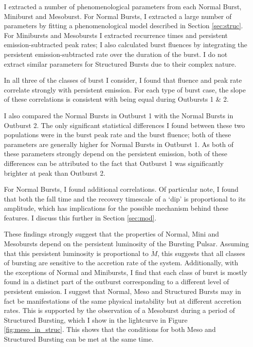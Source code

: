 \par I extracted a number of phenomenological parameters from each Normal Burst, Miniburst and Mesoburst.  For Normal Bursts, I extracted a large number of parameters by fitting a phenomenological model described in Section \ref{sec:struc}.  For Minibursts and Mesobursts I extracted recurrence times and persistent emission-subtracted peak rates; I also calculated burst fluences by integrating the persistent emission-subtracted rate over the duration of the burst.  I do not extract similar parameters for Structured Bursts due to their complex nature.
\par  In all three of the classes of burst I consider, I found that fluence and peak rate correlate strongly with persistent emission.  For each type of burst case, the slope of these correlations is consistent with being equal during Outbursts 1 \& 2.
\par I also compared the Normal Bursts in Outburst 1 with the Normal Bursts in Outburst 2.  The only significant statistical differences I found between these two populations were in the burst peak rate and the burst fluence; both of these parameters are generally higher for Normal Bursts in Outburst 1.  As both of these parameters strongly depend on the persistent emission, both of these differences can be attributed to the fact that Outburst 1 was significantly brighter at peak than Outburst 2.
\par For Normal Bursts, I found additional correlations.  Of particular note, I found that both the fall time and the recovery timescale of a `dip' is proportional to its amplitude, which has implications for the possible mechanism behind these features.  I discuss this further in Section \ref{sec:mod}.
\par These findings strongly suggest that the properties of Normal, Mini and Mesobursts depend on the persistent luminosity of the Bursting Pulsar.  Assuming that this persistent luminosity is proportional to $\dot{M}$, this suggests that all classes of bursting are sensitive to the accretion rate of the system.  Additionally, with the exceptions of Normal and Minibursts, I find that each class of burst is mostly found in a distinct part of the outburst corresponding to a different level of persistent emission.  I suggest that Normal, Meso and Structured Bursts may in fact be manifestations of the same physical instability but at different accretion rates.  This is supported by the observation of a Mesoburst during a period of Structured Bursting, which I show in the lightcurve in Figure \ref{fig:meso_in_struc}.  This shows that the conditions for both Meso and Structured Bursting can be met at the same time.


